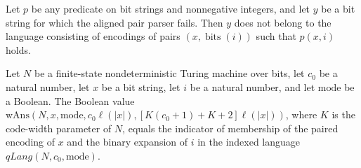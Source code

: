 \begin{lemma}
\label{Complexity.PathHard.not_mem_indexLang_of_pairDecode}
\leanok
{}
Let $p$ be any predicate on bit strings and nonnegative integers, and let $y$ be a bit
string for which the aligned pair parser fails. Then $y$ does not belong to the language
consisting of encodings of pairs $(x,\operatorname{bits}(i))$ such that $p(x,i)$ holds.
\end{lemma}

\begin{lemma}
\label{Complexity.PathHard.wAns_eq}
\leanok
{}
Let $N$ be a finite-state nondeterministic Turing machine over bits, let $c_0$ be a
natural number, let $x$ be a bit string, let $i$ be a natural number, and let
$\mathrm{mode}$ be a Boolean. The Boolean value
$\mathrm{wAns}(N,x,\mathrm{mode},c_0\ell(|x|),[K(c_0+1)+K+2]\ell(|x|))$, where $K$ is
the code-width parameter of $N$, equals the indicator of membership of the paired
encoding of $x$ and the binary expansion of $i$ in the indexed language
$qLang(N,c_0,\mathrm{mode})$.
\end{lemma}

